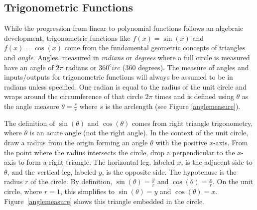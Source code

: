         \subsection{Trigonometric Functions}
        While the progression from linear to polynomial functions follows an algebraic development, trigonometric functions like $f(x) = \sin(x)$ and $f(x) = \cos(x)$ come from the fundamental geometric concepts of triangles and \textit{angle}. Angles, measured in \textit{radians} or \textit{degrees} where a full circle is measured have an angle of $2\pi$ radians or $360^circ$ ($360$ degrees). The measure of angles and inputs/outputs for trigonometric functions will always be assumed to be in radians unless specified. One radian is equal to the radius of the unit circle and wraps around the circumference of that circle $2\pi$ times and is defined using $\theta$ as the angle measure $\theta = \frac{s}{r}$ where $s$ is the arclength (see Figure \ref{anglemeasure}).

        The definition of $\sin(\theta)$ and $\cos(\theta)$ comes from right triangle trigonometry, where $\theta$ is an acute angle (not the right angle). In the context of the unit circle, draw a radius from the origin forming an angle $\theta$ with the positive $x$-axis. From the point where the radius intersects the circle, drop a perpendicular to the $x$-axis to form a right triangle. The horizontal leg, labeled $x$, is the adjacent side to $\theta$, and the vertical leg, labeled $y$, is the opposite side. The hypotenuse is the radius $r$ of the circle. By definition, $\sin(\theta) = \frac{y}{r}$ and $\cos(\theta) = \frac{x}{r}$. On the unit circle, where $r = 1$, this simplifies to $\sin(\theta) = y$ and $\cos(\theta) = x$. Figure~\ref{anglemeasure} shows this triangle embedded in the circle.

